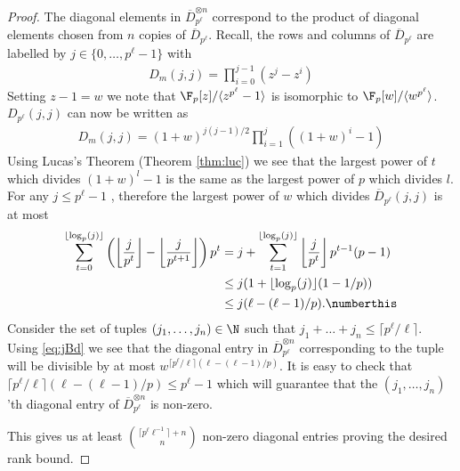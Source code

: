 \begin{proof}
The diagonal elements in $\overline{D}_{p^\ell}^{\otimes n}$ correspond to the product of diagonal elements chosen from $n$ copies of $\overline{D}_{p^\ell}$. Recall, the rows and columns of $\overline{D}_{p^\ell}$ are labelled by $j\in \{0,\hdots,p^\ell-1\}$ with
\begin{align*}
 D_{m}(j,j)=      \prod_{i=0}^{j-1} (z^j-z^i)
 \end{align*}
Setting $z-1=w$ we note that $\F_p[z]/\langle z^{p^\ell}-1\rangle$ is isomorphic to $\F_p[w]/\langle w^{p^\ell}\rangle$. $D_{p^\ell}(j,j)$ can now be written as
\begin{align*}
 D_{m}(j,j)=     (1+w)^{j(j-1)/2} \prod_{i=1}^{j} ((1+w)^i-1)
 \end{align*}
Using Lucas's Theorem (Theorem \ref{thm:luc}) we see that the largest power of $t$ which divides $(1+w)^l-1$ is the same as the largest power of $p$ which divides $l$. For any $j\le p^\ell-1$ , therefore the largest power of $w$ which divides $\overline{D}_{p^\ell}(j,j)$ is at most
\begin{align*}
    \sum\limits_{t=0}^{\lfloor \log_p(j)\rfloor} \left(\left\lfloor \frac{j}{p^t} \right\rfloor-\left\lfloor \frac{j}{p^{t+1}} \right\rfloor\right)p^t&=j+\sum\limits_{t=1}^{\lfloor \log_p(j)\rfloor} \left\lfloor \frac{j}{p^t} \right\rfloor p^{t-1}(p-1)\\
    &\le j(1+\lfloor \log_p(j)\rfloor(1-1/p))\\
    &\le j(\ell -(\ell-1)/p).\numberthis \label{eq:jBd}
\end{align*}
Consider the set of tuples $(j_1,\hdots, j_n)\in \N$ such that $j_1+\hdots+j_n\le \lceil p^\ell/\ell \rceil $. Using \eqref{eq:jBd} we see that the diagonal entry in $\overline{D}_{p^\ell}^{\otimes n}$ corresponding to the tuple will be divisible by at most $w^{\lceil p^\ell/\ell \rceil(\ell -(\ell-1)/p)}$. It is easy to check that $\lceil p^\ell/\ell \rceil(\ell -(\ell-1)/p)\le p^\ell -1$ which will guarantee that the $(j_1,\hdots,j_n)$'th diagonal entry of $\overline{D}_{p^\ell}^{\otimes n}$ is non-zero. 

This gives us at least $\binom{\lceil p^\ell \ell^{-1} \rceil+n}{n}$ non-zero diagonal entries proving the desired rank bound.
\end{proof}